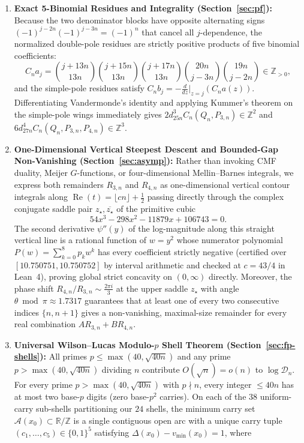 \documentclass[11pt,reqno]{amsart}
\theoremstyle{definition}
\theoremstyle{remark}
\newcommand{\ZZ}{\mathbb{Z}}
\newcommand{\RR}{\mathbb{R}}
\begin{document}
\begin{enumerate}
  \item \textbf{Exact 5-Binomial Residues and Integrality (Section~\ref{sec:pf}):} Because the two denominator blocks have opposite alternating signs $(-1)^{j-2n}(-1)^{j-3n} = (-1)^n$ that cancel all $j$-dependence, the normalized double-pole residues are strictly positive products of five binomial coefficients:
  \[
    C_n a_j = \binom{j+13n}{13n}\binom{j+15n}{13n}\binom{j+17n}{13n}\binom{20n}{j-3n}\binom{19n}{j-2n} \in \ZZ_{>0},
  \]
  and the simple-pole residues satisfy $C_n b_j = -\frac{d}{dz}\big|_{z=j}(C_n a(z))$. Differentiating Vandermonde's identity and applying Kummer's theorem on the simple-pole wings immediately gives $2 d_{25n}^3 C_n(Q_n, P_{3,n}) \in \ZZ^2$ and $6 d_{27n}^4 C_n(Q_n, P_{3,n}, P_{4,n}) \in \ZZ^3$.
  \item \textbf{One-Dimensional Vertical Steepest Descent and Bounded-Gap Non-Vanishing (Section~\ref{sec:asymp}):} Rather than invoking CMF duality, Meijer $G$-functions, or four-dimensional Mellin--Barnes integrals, we express both remainders $R_{3,n}$ and $R_{4,n}$ as one-dimensional vertical contour integrals along $\operatorname{Re}(t) = \lfloor c n \rfloor + \frac{1}{2}$ passing directly through the complex conjugate saddle pair $z_\star, \overline{z_\star}$ of the primitive cubic
  \[
    54x^3 - 298x^2 - 11879x + 106743 = 0.
  \]
  The second derivative $\psi''(y)$ of the log-magnitude along this straight vertical line is a rational function of $w = y^2$ whose numerator polynomial $P(w) = \sum_{k=0}^{8} p_k w^k$ has every coefficient strictly negative (certified over $[10.750751, 10.750752]$ by interval arithmetic and checked at $c = 43/4$ in Lean~4), proving global strict concavity on $(0, \infty)$ directly. Moreover, the phase shift $R_{4,n}/R_{3,n} \sim \frac{2\pi i}{3}$ at the upper saddle $z_\star$ with angle $\theta \bmod \pi \approx 1.7317$ guarantees that at least one of every two consecutive indices $\{n, n+1\}$ gives a non-vanishing, maximal-size remainder for every real combination $A R_{3,n} + B R_{4,n}$.
  \item \textbf{Universal Wilson--Lucas Modulo-$p$ Shell Theorem (Section~\ref{sec:fp-shells}):} All primes $p \le \max(40, \sqrt{40n})$ and any prime $p > \max(40, \sqrt{40n})$ dividing $n$ contribute $O(\sqrt{n}) = o(n)$ to $\log\mathcal{D}_n$. For every prime $p > \max(40, \sqrt{40n})$ with $p \nmid n$, every integer $\le 40n$ has at most two base-$p$ digits (zero base-$p^2$ carries). On each of the $38$ uniform-carry sub-shells partitioning our $24$ shells, the minimum carry set $\mathcal{A}(x_0) \subset \RR/\ZZ$ is a single contiguous open arc with a unique carry tuple $(c_1,\dots,c_5) \in \{0,1\}^5$ satisfying $\Delta(x_0) - v_{\min}(x_0) = 1$, where

\end{enumerate}
\end{document}
